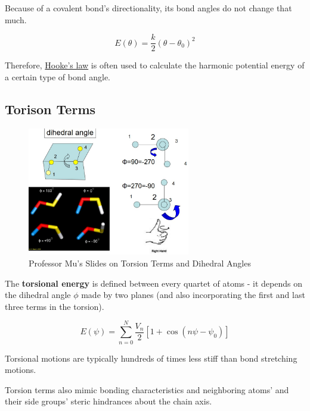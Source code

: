 \documentclass[
  letterpaper,
  DIV=11,
  numbers=noendperiod]{scrreprt}
\begin{document}
Because of a covalent bond's directionality, its bond angles do not
change that much.

\begin{equation}
  E(\theta) = \frac{k}{2}(\theta - \theta_0)^2
\end{equation}

Therefore,
\href{https://www.khanacademy.org/science/physics/work-and-energy/hookes-law/a/what-is-hookes-law}{Hooke's
law} is often used to calculate the harmonic potential energy of a
certain type of bond angle.

\hypertarget{torison-terms}{%
\subsection{Torison Terms}\label{torison-terms}}

\begin{figure}

{\centering \includegraphics[width=2.79in,height=\textheight]{./images/wk2/torsional.jpg}

}

\caption{Professor Mu's Slides on Torsion Terms and Dihedral Angles}

\end{figure}

The \textbf{torsional energy} is defined between every quartet of atoms
- it depends on the dihedral angle \(\phi\) made by two planes (and also
incorporating the first and last three terms in the torsion).

\begin{equation}
  E(\psi) = \sum_{n = 0}^N\frac{V_n}{2}[1 + \cos(n\psi - \psi_0)]
\end{equation}

Torsional motions are typically hundreds of times less stiff than bond
stretching motions.

Torsion terms also mimic bonding characteristics and neighboring atoms'
and their side groups' steric hindrances about the chain axis.
\end{document}

